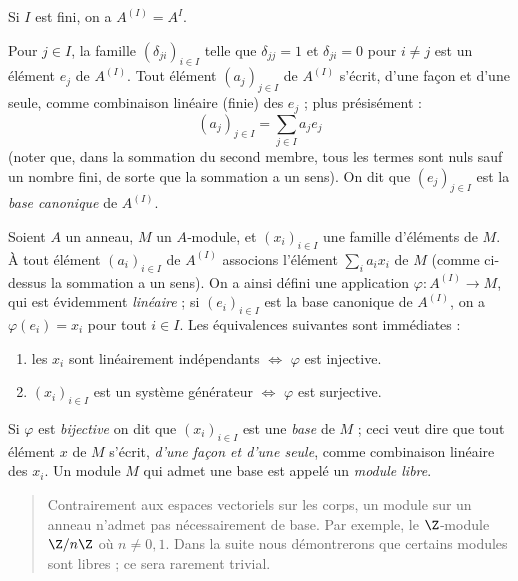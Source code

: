 \documentclass[11pt, useosf,
  title in boldface,
  theorem in new line,
  theorem numbering = section,
  number theorems separately,
]{simplivre}
\begin{document}
    Si \( I \) est fini, on a \( A^{(I)} = A^I \).

    Pour \( j \in I \), la famille \( (\delta_{ji})_{i \in I} \) telle que \( \delta_{jj} = 1 \) et \( \delta_{ji} = 0 \) pour \( i \neq j \) est un élément \( e_j \) de \( A^{(I)} \). Tout élément \( (a_j)_{j \in I} \) de \( A^{(I)} \) s'écrit, d'une façon et d'une seule, comme combinaison linéaire (finie) des \( e_j \) ; plus présisément :
    \begin{equation}
        (a_j)_{j \in I} = \sum_{j \in I} a_j e_j
    \end{equation}
    (noter que, dans la sommation du second membre, tous les termes sont nuls sauf un nombre fini, de sorte que la sommation a un sens). On dit que \( (e_j)_{j \in I} \) est la \emph{base canonique} de \( A^{(I)} \).

    Soient \( A \) un anneau, \( M \) un \( A \)‑module, et \( (x_i)_{i \in I} \) une famille d'éléments de \( M \). À tout élément \( (a_i)_{i \in I} \) de \( A^{(I)} \) associons l'élément \( \sum_i a_i x_i \) de \( M \) (comme ci-dessus la sommation a un sens). On a ainsi défini une application \( \varphi \colon A^{(I)} \to M \), qui est évidemment \emph{linéaire} ; si \( (e_i)_{i \in I} \) est la base canonique de \( A^{(I)} \), on a \( \varphi(e_i) = x_i \) pour tout \( i \in I \). Les équivalences suivantes sont immédiates :
\pagebreak
    \begin{enumerate}
        \item les \( x_i \) sont linéairement indépendants \( \iff \) \( \varphi \) est injective.
        \item \( (x_i)_{i \in I} \) est un système générateur \( \iff \) \( \varphi \) est surjective.
    \end{enumerate}
    Si \( \varphi \) est \emph{bijective} on dit que \( (x_i)_{i \in I} \) est une \emph{base} de \( M \) ; ceci veut dire que tout élément \( x \) de \( M \) s'écrit, \emph{d'une façon et d'une seule}, comme combinaison linéaire des \( x_i \). Un module \( M \) qui admet une base est appelé un \emph{module libre}.

    \begin{quote}
        Contrairement aux espaces vectoriels sur les corps, un module sur un anneau n'admet pas nécessairement de base. Par exemple, le \( \Z \)‑module \( \Z/n\Z \) où \( n \neq 0,1 \). Dans la suite nous démontrerons que certains modules sont libres ; ce sera rarement trivial.
    \end{quote}
\end{document}
